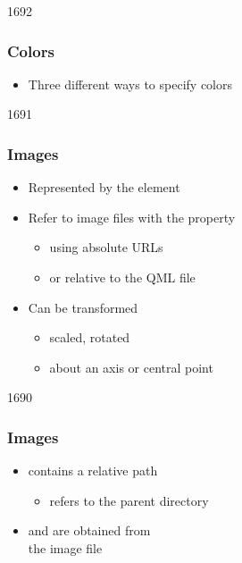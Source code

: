 
\begin{slide}{1692}\frametitle{Colors}


\begin{itemize}
\item Three different ways to specify colors
\end{itemize}

\end{slide}


\begin{slide}{1691}\frametitle{Images}

\begin{itemize}
\item Represented by the  element
\item Refer to image files with the  property
  \begin{itemize}
  \item using absolute URLs
  \item or relative to the QML file
  \end{itemize}
\item Can be transformed
  \begin{itemize}
  \item scaled, rotated
  \item about an axis or central point
  \end{itemize}
\end{itemize}


\end{slide}


\begin{slide}{1690}\frametitle{Images}


\begin{itemize}
\item {} contains a relative path
  \begin{itemize}
  \item {} refers to the parent directory
  \end{itemize}
\item {} and  are obtained from\\
the image file
\end{itemize}

\end{slide}

